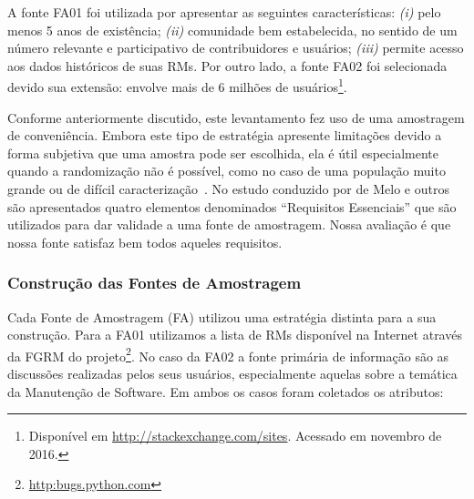 A fonte FA01 foi utilizada por apresentar as seguintes características:
\textit{(i)} pelo menos 5 anos de existência; \textit{(ii)} comunidade bem
estabelecida, no sentido de um número relevante e participativo de
contribuidores e usuários; \textit{(iii)} permite acesso aos dados históricos de
suas RMs. Por outro lado, a fonte FA02 foi selecionada devido sua extensão:
envolve mais de 6 milhões de usuários\footnote{Disponível em
    \url{http://stackexchange.com/sites}. Acessado em novembro de 2016.}.

Conforme anteriormente discutido, este levantamento fez uso de uma amostragem de
conveniência. Embora este tipo de estratégia apresente limitações devido a forma
subjetiva que uma amostra pode ser escolhida, ela é útil especialmente quando a
randomização não é possível, como no caso de uma população muito grande ou de
difícil caracterização~\cite{boxill1997introduction}. No estudo conduzido por de
Melo e outros~\cite{de2014towards} são apresentados quatro elementos denominados
``Requisitos Essenciais'' que são utilizados para dar validade a uma fonte de
amostragem. Nossa avaliação é que nossa fonte satisfaz bem todos aqueles
requisitos.



\subsubsection{Construção das Fontes de Amostragem}
\label{subsubsec:construcao_fonte_amostragem}

Cada Fonte de Amostragem (FA) utilizou uma estratégia distinta para a sua
construção. Para a FA01 utilizamos a lista de RMs disponível na Internet através
da FGRM do projeto\footnote{\url{http:bugs.python.com}}. No caso da FA02 a fonte
primária de informação são as discussões realizadas pelos seus usuários,
especialmente aquelas sobre a temática da Manutenção de Software. Em ambos os
casos foram coletados os atributos:

